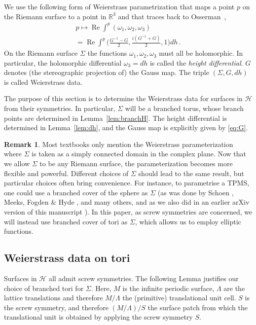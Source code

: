 \documentclass[a4paper]{amsart}
\newcommand{\R}{\mathbb{R}}
\newcommand{\re}{\operatorname{Re}}
\theoremstyle{plain}
\theoremstyle{definition}
\newtheorem{remark}[theorem]{Remark}
\def \cH {\mathcal{H}}
\begin{document}
We use the following form of Weierstrass parametrization that maps a point $p$ on the Riemann surface to a point in $\R^3$ and that traces back to
Osserman~\cite{osserman1964},
\begin{multline}\label{eq:weierstrass2}
	p \mapsto \re\int^p (\omega_1, \omega_2, \omega_3)\\
  = \re\int^p \Big(\frac{G^{-1}-G}{2}, \frac{i(G^{-1}+G)}{2},
	1\Big) dh\,.
\end{multline}
On the Riemann surface $\Sigma$ the functions $\omega_1, \omega_2, \omega_3$
must all be holomorphic.  In particular, the holomorphic differential $\omega_3
= dh$ is called the \textit{height differential}.  $G$ denotes (the stereographic
projection of) the Gauss map.  The triple $(\Sigma, G, dh)$ is called
Weierstrass data.

The purpose of this section is to determine the Weierstrass data for surfaces
in $\cH$ from their symmetries.  In particular, $\Sigma$ will be a branched
torus, whose branch points are determined in Lemma~\ref{lem:branchH}.  The
height differential is determined in Lemma~\ref{lem:dh}, and the Gauss map is
explicitly given by \eqref{eq:G}.

\begin{remark}\label{rem:sigma}
  Most textbooks only mention the Weierstrass parameterization where $\Sigma$
  is taken as a simply connected domain in the complex plane.  Now that we
  allow $\Sigma$ to be any Riemann surface, the parameterization becomes more
  flexible and powerful.  Different choices of $\Sigma$ should lead to the same
  result, but particular choices often bring convenience.  For instance, to
  parametrise a TPMS, one could use a branched cover of the sphere as $\Sigma$
  (as was done by Schoen \cite{Schoen_1970}, Meeks\cite{Meeks1975, meeks1990},
  	Fogden \& Hyde \cite{Fogden_i_1992, Fogden_ii_1992, Fogden_iii_1993}, and
		many others, and as we also did in an earlier arXiv version of this manuscript
	\cite{preprint}).  In this paper, as screw symmetries are concerned, we will
	instead use branched cover of tori as $\Sigma$, which allows us to employ
	elliptic functions.
\end{remark}

\subsection{Weierstrass data on tori}

Surfaces in $\cH$ all admit screw symmetries. The following Lemma justifies our
choice of branched tori for $\Sigma$. Here, $M$ is the infinite periodic
surface, $\Lambda$ are the lattice translations and therefore $M/\Lambda$ the
(primitive) translational unit cell. $S$ is the screw symmetry, and therefore
$(M/\Lambda)/S$ the surface patch from which the translational unit is obtained
by applying the screw symmetry $S$.
\end{document}
